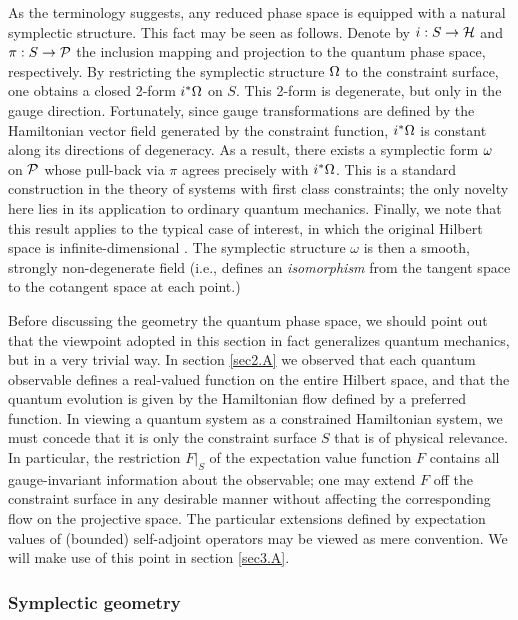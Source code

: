 As the terminology suggests, any reduced phase space is equipped with
a natural symplectic structure.  This fact may be seen as follows.
Denote by $i:S\rightarrow\H$ and $\pi:S\rightarrow\P$ the inclusion
mapping and projection to the quantum phase space, respectively.  By
restricting the symplectic structure $\W$ to the constraint surface,
one obtains a closed 2-form $i^*\W$ on $S$.  This 2-form is
degenerate, but only in the gauge direction.  Fortunately, since gauge
transformations are defined by the Hamiltonian vector field generated
by the constraint function, $i^*\W$ is constant along its directions
of degeneracy.  As a result, there exists a symplectic form $\w$ on
$\P$ whose pull-back via $\pi$ agrees precisely with $i^*\W$. This is
a standard construction in the theory of systems with first class
constraints; the only novelty here lies in its application to ordinary
quantum mechanics.  Finally, we note that this result applies to the
typical case of interest, in which the original Hilbert space is
infinite-dimensional \cite{thesis}. The symplectic structure $\omega$
is then a smooth, strongly non-degenerate field (i.e., defines an {\it
isomorphism} from the tangent space to the cotangent space at each
point.)

Before discussing the geometry the quantum phase space, we should
point out that the viewpoint adopted in this section in fact
generalizes quantum mechanics, but in a very trivial way.  In section
\ref{sec2.A} we observed that each quantum observable defines a
real-valued function on the entire Hilbert space, and that the quantum
evolution is given by the Hamiltonian flow defined by a preferred
function.  In viewing a quantum system as a constrained Hamiltonian
system, we must concede that it is only the constraint surface $S$
that is of physical relevance.  In particular, the restriction $F|_S$
of the expectation value function $F$ contains all gauge-invariant
information about the observable; one may extend $F$ off the
constraint surface in any desirable manner without affecting the
corresponding flow on the projective space.  The particular extensions
defined by expectation values of (bounded) self-adjoint operators may
be viewed as mere convention.  We will make use of this point in
section \ref{sec3.A}.


\subsubsection{Symplectic geometry}

